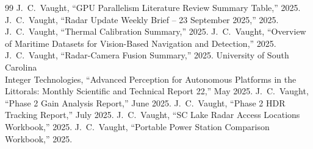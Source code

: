 \documentclass[12pt]{article}
\begin{document}
\begin{thebibliography}{99}
 J.~C.~Vaught, ``GPU Parallelism Literature Review Summary Table,'' 2025.
 J.~C.~Vaught, ``Radar Update Weekly Brief -- 23 September 2025,'' 2025.
 J.~C.~Vaught, ``Thermal Calibration Summary,'' 2025.
 J.~C.~Vaught, ``Overview of Maritime Datasets for Vision-Based Navigation and Detection,'' 2025.
 J.~C.~Vaught, ``Radar-Camera Fusion Summary,'' 2025.
 University of South Carolina \\ Integer Technologies, ``Advanced Perception for Autonomous Platforms in the Littorals: Monthly Scientific and Technical Report 22,'' May 2025.
 J.~C.~Vaught, ``Phase 2 Gain Analysis Report,'' June 2025.
 J.~C.~Vaught, ``Phase 2 HDR Tracking Report,'' July 2025.
 J.~C.~Vaught, ``SC Lake Radar Access Locations Workbook,'' 2025.
 J.~C.~Vaught, ``Portable Power Station Comparison Workbook,'' 2025.
\end{thebibliography}
\end{document}
